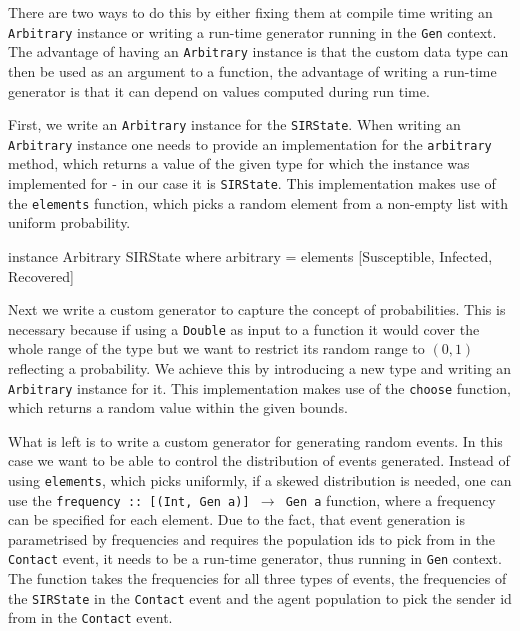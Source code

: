 There are two ways to do this by either fixing them at compile time writing an \texttt{Arbitrary} instance or writing a run-time generator running in the \texttt{Gen} context. The advantage of having an \texttt{Arbitrary} instance is that the custom data type can then be used as an argument to a function, the advantage of writing a run-time generator is that it can depend on values computed during run time.

First, we write an \texttt{Arbitrary} instance for the \texttt{SIRState}. When writing an \texttt{Arbitrary} instance one needs to provide an implementation for the \texttt{arbitrary} method, which returns a value of the given type for which the instance was implemented for - in our case it is \texttt{SIRState}. This implementation makes use of the \texttt{elements} function, which picks a random element from a non-empty list with uniform probability.

\begin{HaskellCode}
instance Arbitrary SIRState where
  arbitrary = elements [Susceptible, Infected, Recovered]
\end{HaskellCode}

Next we write a custom generator to capture the concept of probabilities. This is necessary because if using a \texttt{Double} as input to a function it would cover the whole range of the type but we want to restrict its random range to $(0,1)$ reflecting a probability. We achieve this by introducing a new type and writing an \texttt{Arbitrary} instance for it. This implementation makes use of the \texttt{choose} function, which returns a random value within the given bounds.


What is left is to write a custom generator for generating random events. In this case we want to be able to control the distribution of events generated. Instead of using \texttt{elements}, which picks uniformly, if a skewed distribution is needed, one can use the \texttt{frequency :: [(Int, Gen a)] $\rightarrow$ Gen a} function, where a frequency can be specified for each element. Due to the fact, that event generation is parametrised by frequencies and requires the population ids to pick from in the \texttt{Contact} event, it needs to be a run-time generator, thus running in \texttt{Gen} context. The function takes the frequencies for all three types of events, the frequencies of the \texttt{SIRState} in the \texttt{Contact} event and the agent population to pick the sender id from in the \texttt{Contact} event.

